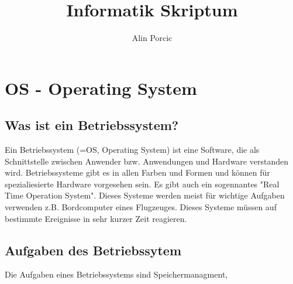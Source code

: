 \documentclass[a4paper]{report}
\title{Informatik Skriptum}
\author{Alin Porcic}
\begin{document}
\maketitle
\tableofcontents

\chapter{OS - Operating System}

\section{Was ist ein Betriebssystem?}

Ein Betriebssystem (=OS, Operating System) ist eine Software, die als Schnittstelle zwischen Anwender bzw. Anwendungen und Hardware verstanden wird.
Betriebssysteme gibt es in allen Farben und Formen und können für spezialiesierte Hardware vorgesehen sein. Es gibt auch ein sogennantes "Real Time
Operation System". Dieses Systeme werden meist für wichtige Aufgaben verwenden z.B. Bordcomputer eines Flugzeuges. Dieses Systeme müssen auf bestimmte
Ereignisse in sehr kurzer Zeit reagieren.


\section{Aufgaben des Betriebssytem}

Die Aufgaben eines Betriebssystems sind Speichermanagment,
\end{document}
